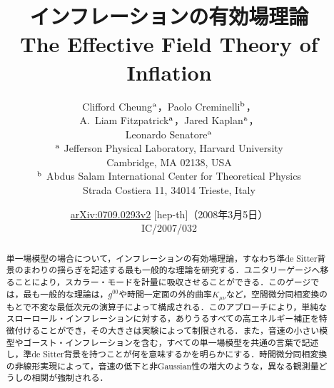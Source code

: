\documentclass[a4paper,11pt]{ltjsarticle}
\title{\bfseries インフレーションの有効場理論\\[0.4em]
{\large The Effective Field Theory of Inflation}}
\author{Clifford Cheung$^{\rm a}$，Paolo Creminelli$^{\rm b}$，\\
A.~Liam Fitzpatrick$^{\rm a}$，Jared Kaplan$^{\rm a}$，\\
Leonardo Senatore$^{\rm a}$\\[0.7em]
{\small $^{\rm a}$ Jefferson Physical Laboratory, Harvard University}\\
{\small Cambridge, MA 02138, USA}\\[0.3em]
{\small $^{\rm b}$ Abdus Salam International Center for Theoretical Physics}\\
{\small Strada Costiera 11, 34014 Trieste, Italy}}
\date{\small \href{https://arxiv.org/pdf/0709.0293v2}{arXiv:0709.0293v2} [hep-th]（2008年3月5日）\\IC/2007/032}
\begin{document}
\maketitle
\nocite{Creminelli:2006xe,Alishahiha:2004eh,Chen:2005ad,Shandera:2006ax,Kecskemeti:2006cg,Shiu:2006kj,Arkani-Hamed:2003juy,Dubovsky:2005xd,Cornwall:1974km,Salopek:1990jq,Lyth:2004gb,Cheung:2007sv,Maldacena:2002vr,Seery:2006vu,tHooft:1974toh,Barbieri:2004qk,Hsu:2004vr,Adams:2006sv,Mukhanov:2005bu,Garriga:1999vw,Chen:2006nt,Babich:2004gb,Creminelli:2006rz,Chen:2006dfn,Arkani-Hamed:2003pdi,Arkani-Hamed:2005teg,Senatore:2004rj,Polchinski:1992ed,Buchbinder:2007ad,Creminelli:2007aq,Arkani-Hamed:2007ryv,Wald:1984rg}

\begin{abstract}
単一場模型の場合について，インフレーションの有効場理論，すなわち準de Sitter背景のまわりの揺らぎを記述する最も一般的な理論を研究する．ユニタリーゲージへ移ることにより，スカラー・モードを計量に吸収させることができる．このゲージでは，最も一般的な理論は，$g^{00}$や時間一定面の外的曲率$K_{\mu\nu}$など，空間微分同相変換のもとで不変な最低次元の演算子によって構成される．このアプローチにより，単純なスローロール・インフレーションに対する，ありうるすべての高エネルギー補正を特徴付けることができ，その大きさは実験によって制限される．また，音速の小さい模型やゴースト・インフレーションを含む，すべての単一場模型を共通の言葉で記述し，準de Sitter背景を持つことが何を意味するかを明らかにする．時間微分同相変換の非線形実現によって，音速の低下と非Gaussian性の増大のような，異なる観測量どうしの相関が強制される．
\end{abstract}
\clearpage
\hypertarget{toc}{}
\tableofcontents
\clearpage





\clearpage
\renewcommand{\refname}{\hyperlink{toc}{参考文献}}


\clearpage
{}
\end{document}
